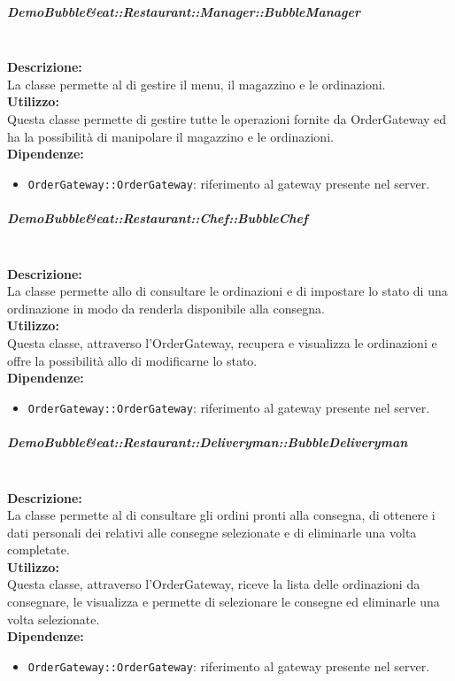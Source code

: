\subparagraph{Demo\-Bubble\&eat\-::Restaurant\-::Manager\-::Bubble\-Manager}\label{eat-manager}\mbox{}\\
\textbf{Descrizione:}\\
La classe permette al \Manager{} di gestire il menu, il magazzino e le ordinazioni.\\
\textbf{Utilizzo:}\\
Questa classe permette di gestire tutte le operazioni fornite da Order\-Gateway ed ha la possibilità di manipolare il magazzino e le ordinazioni.\\
\textbf{Dipendenze:}
\begin{itemize}
	\item \texttt{OrderGateway::OrderGateway}: riferimento al gateway presente nel server.
\end{itemize}

\subparagraph{Demo\-Bubble\&eat\-::Restaurant\-::Chef\-::Bubble\-Chef}\label{eat-chef}\mbox{}\\
\textbf{Descrizione:}\\
La classe permette allo \Chef{} di consultare le ordinazioni e di impostare lo stato di una ordinazione in modo da renderla disponibile alla consegna.\\
\textbf{Utilizzo:}\\
Questa classe, attraverso l'Order\-Gateway, recupera e visualizza le ordinazioni e offre la possibilità allo \Chef{} di modificarne lo stato.\\
\textbf{Dipendenze:}
\begin{itemize}
	\item \texttt{OrderGateway::OrderGateway}: riferimento al gateway presente nel server.
\end{itemize}

\subparagraph{Demo\-Bubble\&eat\-::Restaurant\-::Deliveryman\-::Bubble\-Deli\-very\-man}\label{eat-deliveryman}\mbox{}\\
\textbf{Descrizione:}\\
La classe permette al \Deliveryman{} di consultare gli ordini pronti alla consegna, di ottenere i dati personali dei \Customer[2]{} relativi alle consegne selezionate e di eliminarle una volta completate.\\
\textbf{Utilizzo:}\\
Questa classe, attraverso l'Order\-Gateway, riceve la lista delle ordinazioni da consegnare, le visualizza e permette di selezionare le consegne ed eliminarle una volta selezionate.\\
\textbf{Dipendenze:}
\begin{itemize}
	\item \texttt{OrderGateway::OrderGateway}: riferimento al gateway presente nel server.
\end{itemize}

